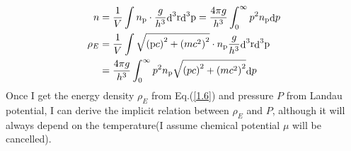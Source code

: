 \documentclass[preprint]{revtex4-1}
\begin{document}
\begin{align}
n &= \frac{1}{V}\int {{n_{\rm{p}}} \cdot \frac{g}{{{h^3}}}{\mathop{\rm d}\nolimits}^3 {\rm{r}}{\mathop{\rm d}\nolimits}^3 {\rm{p}}}  = \frac{{4\pi g}}{{{h^3}}}\int_0^\infty  {{p^2}{n_{\rm{p}}}{\mathop{\rm d}\nolimits} p} \label{1.5}\\
{\rho _E} &= \frac{1}{V}\int {\sqrt {{{\left( {{\rm{p}}c} \right)}^2} + {{\left( {m{c^2}} \right)}^2}}  \cdot {n_{\rm{p}}}\frac{g}{{{h^3}}}{\mathop{\rm d}\nolimits}^3 {\rm{r}}{\mathop{\rm d}\nolimits}^3 {\rm{p}}}  \nonumber \\
&= \frac{{4\pi g}}{{{h^3}}}\int_0^\infty  {{p^2}{n_{\rm{p}}}\sqrt {{{\left( {pc} \right)}^2} + {{\left( {m{c^2}} \right)}^2}} {\mathop{\rm d}\nolimits} p} \label{1.6}
\end{align}
Once I get the energy density ${\rho _E}$ from Eq.(\ref{1.6}) and pressure $P$ from Landau potential, I can derive the implicit relation between ${\rho _E}$ and $P$, although it will always depend on the temperature(I assume chemical potential $\mu$  will be cancelled).
\end{document}
